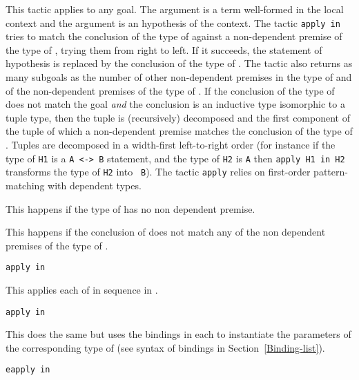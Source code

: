 \begin{coq_example*}
This tactic applies to any goal.  The argument {\term} is a term
well-formed in the local context and the argument {\ident} is an
hypothesis of the context.  The tactic {\tt apply {\term} in {\ident}}
tries to match the conclusion of the type of {\ident} against a
non-dependent premise of the type of {\term}, trying them from right to
left.  If it succeeds, the statement of hypothesis {\ident} is
replaced by the conclusion of the type of {\term}. The tactic also
returns as many subgoals as the number of other non-dependent premises
in the type of {\term} and of the non-dependent premises of the type
of {\ident}.  If the conclusion of the type of {\term} does not match
the goal {\em and} the conclusion is an inductive type isomorphic to a
tuple type, then the tuple is (recursively) decomposed and the first
component of the tuple of which a non-dependent premise matches the
conclusion of the type of {\ident}. Tuples are decomposed in a
width-first left-to-right order (for instance if the type of {\tt H1}
is a \verb=A <-> B= statement, and the type of {\tt H2} is \verb=A=
then {\tt apply H1 in H2} transforms the type of {\tt H2} into {\tt
  B}). The tactic {\tt apply} relies on first-order pattern-matching
with dependent types.

\begin{ErrMsgs}
\item {}

This happens if the type of {\term} has no non dependent premise.

\item {}

This happens if the conclusion of {\ident} does not match any of the
non dependent premises of the type of {\term}.
\end{ErrMsgs}

\begin{Variants}
\item {\tt apply \nelist{\term}{,} in {\ident}}

This applies each of {\term} in sequence in {\ident}.

\item {\tt apply  in {\ident}}

This does the same but uses the bindings in each {\bindinglist} to
instantiate the parameters of the corresponding type of {\term}
(see syntax of bindings in Section~\ref{Binding-list}).

\item {\tt eapply  in {\ident}}


\end{Variants}
\end{coq_example*}
